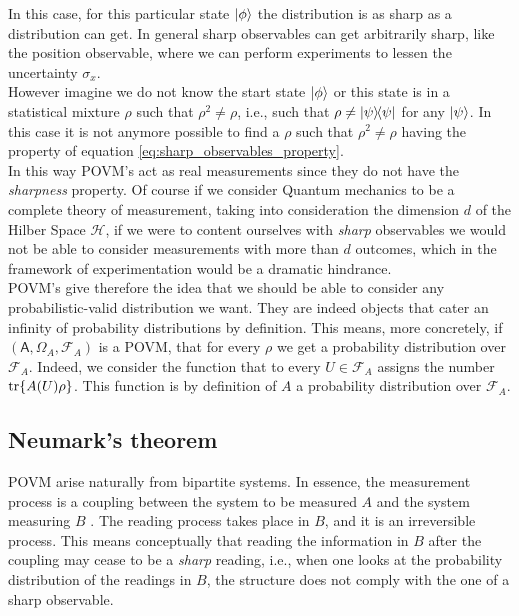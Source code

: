 \documentclass[10pt, a4paper]{amsart}
\begin{document}
In this case, for this particular state $\left| \phi\right\rangle$ the distribution is as sharp as a distribution can get. In general sharp observables can get 
arbitrarily sharp, like the position observable, where we can perform experiments to lessen the uncertainty $\sigma_{x}$.  \\

However imagine we do not know the start state $\left| \phi\right\rangle$ or this state is in a statistical mixture $\rho$ such that $\rho^{2}\neq \rho$, i.e., such that $\rho \neq \left| \psi\right\rangle\!\!\left\langle \psi\right|$ for any $\left| \psi\right\rangle$. In this case it is not anymore possible to find a $\rho$ such that $\rho^{2}\neq \rho$
having the property of equation \ref{eq:sharp_observables_property}. \\

In this way POVM's act as real measurements \cite{ludwig1953messprozess} since they do not have the \textit{sharpness} property. 
Of course if we consider Quantum mechanics to be a complete theory of measurement, taking into consideration the dimension $d$ of the Hilber Space $\mathcal{H}$, if we were to content ourselves with \textit{sharp} observables we would not be able to consider  measurements with more than $d$ outcomes, which in the framework of experimentation would be a dramatic hindrance. \\

POVM's give therefore the idea that we should be able to consider any probabilistic-valid distribution we want. They are indeed objects that 
cater an infinity of probability distributions by definition. This means, more concretely, if $(\mathsf{A},\Omega_{A}, \mathcal{F}_{A})$ is a POVM, that for every $\rho$ we get a probability distribution over $\mathcal{F}_{A}$. Indeed, we consider the function that to every $U\in \mathcal{F}_{A}$ assigns the number $\mathrm{tr} \{A(U) \rho\}$. This function is by definition of $A$ a probability distribution over $\mathcal{F}_{A}$. 
 

\subsection{Neumark's theorem}


POVM arise naturally from bipartite systems. In essence, the measurement process is a coupling between the system to be measured $A$ and the system measuring $B$ \cite{ludwig1953messprozess}.
The reading process takes place in $B$, and it is an irreversible process.  This means conceptually that reading the information in $B$ after the coupling may cease to be a \textit{sharp} reading, i.e., when one looks at the probability distribution of the readings in $B$, the structure 
does not comply with the one of a sharp observable.\\
\end{document}
